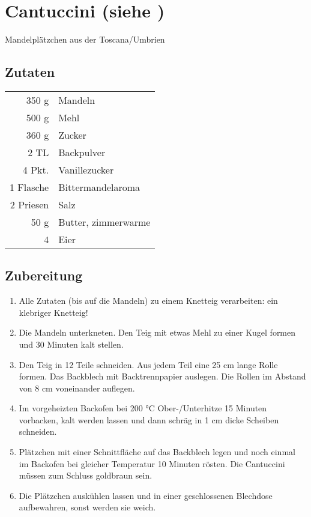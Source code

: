 \section[Cantuccini]{Cantuccini \textmd{(siehe \cite{ChefkochCantuccini})}}
Mandelplätzchen aus der Toscana/Umbrien
\subsection*{Zutaten}

\begin {tabular}{r l}
    350 g & Mandeln \\
    500 g & Mehl \\
    360 g & Zucker \\
    2 TL & Backpulver \\
    4 Pkt. & Vanillezucker \\
    1 Flasche & Bittermandelaroma \\
    2 Priesen & Salz \\
    50 g & Butter, zimmerwarme \\
    4 & Eier
\end{tabular}
\subsection*{Zubereitung}
\begin{enumerate}
    \item  Alle Zutaten (bis auf die Mandeln) zu einem Knetteig verarbeiten: ein klebriger Knetteig!
    \item  Die Mandeln unterkneten. Den Teig mit etwas Mehl zu einer Kugel formen und 30 Minuten kalt stellen.
    \item  Den Teig in 12 Teile schneiden. Aus jedem Teil eine 25 cm lange Rolle formen. Das Backblech mit Backtrennpapier auslegen. Die Rollen im
    Abstand von 8 cm voneinander auflegen.
    \item  Im vorgeheizten Backofen bei 200 °C Ober-/Unterhitze 15 Minuten vorbacken, kalt werden lassen und dann schräg in 1 cm dicke
    Scheiben schneiden.
    \item  Plätzchen mit einer Schnittfläche auf das Backblech legen und noch einmal im Backofen bei gleicher Temperatur 10 Minuten rösten. Die Cantuccini müssen zum Schluss
    goldbraun sein.
    \item  Die Plätzchen auskühlen lassen und in einer geschlossenen Blechdose aufbewahren, sonst werden sie weich. 
\end{enumerate}
